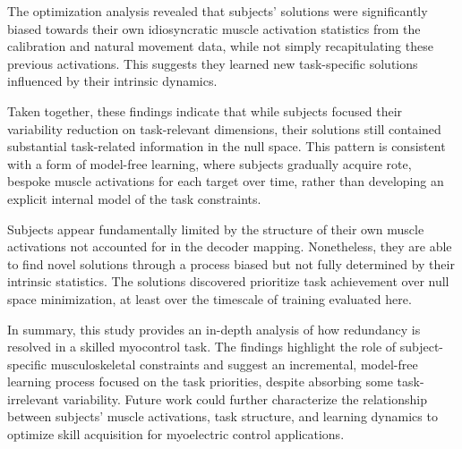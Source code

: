 \documentclass[../main.tex]{subfiles}
\begin{document}
  The optimization analysis revealed that subjects' solutions were significantly biased towards their own idiosyncratic muscle activation statistics from the calibration and natural movement data, while not simply recapitulating these previous activations. This suggests they learned new task-specific solutions influenced by their intrinsic dynamics.

  Taken together, these findings indicate that while subjects focused their variability reduction on task-relevant dimensions, their solutions still contained substantial task-related information in the null space. This pattern is consistent with a form of model-free learning, where subjects gradually acquire rote, bespoke muscle activations for each target over time, rather than developing an explicit internal model of the task constraints.

  Subjects appear fundamentally limited by the structure of their own muscle activations not accounted for in the decoder mapping. Nonetheless, they are able to find novel solutions through a process biased but not fully determined by their intrinsic statistics. The solutions discovered prioritize task achievement over null space minimization, at least over the timescale of training evaluated here.

  In summary, this study provides an in-depth analysis of how redundancy is resolved in a skilled myocontrol task. The findings highlight the role of subject-specific musculoskeletal constraints and suggest an incremental, model-free learning process focused on the task priorities, despite absorbing some task-irrelevant variability. Future work could further characterize the relationship between subjects' muscle activations, task structure, and learning dynamics to optimize skill acquisition for myoelectric control applications.

  
  \cleardoublepage\printendnotes%
  \ifSubfilesClassLoaded{%
      \newpage%
  }{}%
  
\end{document}
